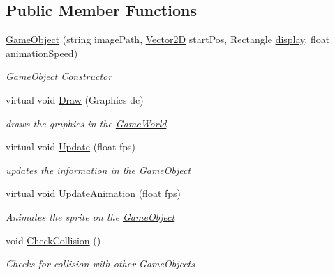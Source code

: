 \subsection*{Public Member Functions}
\begin{DoxyCompactItemize}
\item 
\hyperlink{class_mage_twinstick_1_1_game_object_a70fd6f506e37d368c4b5dc324286e0ec}{Game\+Object} (string image\+Path, \hyperlink{class_mage_twinstick_1_1_vector2_d}{Vector2\+D} start\+Pos, Rectangle \hyperlink{class_mage_twinstick_1_1_game_object_a5807df7f837dc87c8955a008d0b27b50}{display}, float \hyperlink{class_mage_twinstick_1_1_game_object_a5d21c31402c27c5a19f2a62d98720456}{animation\+Speed})
\begin{DoxyCompactList}\small\item\em \hyperlink{class_mage_twinstick_1_1_game_object}{Game\+Object} Constructor \end{DoxyCompactList}\item 
virtual void \hyperlink{class_mage_twinstick_1_1_game_object_a11628f4d9b508e2d976ca25f716b74f5}{Draw} (Graphics dc)
\begin{DoxyCompactList}\small\item\em draws the graphics in the \hyperlink{class_mage_twinstick_1_1_game_world}{Game\+World} \end{DoxyCompactList}\item 
virtual void \hyperlink{class_mage_twinstick_1_1_game_object_a3de8248d06d234f8335525bbb28ccacc}{Update} (float fps)
\begin{DoxyCompactList}\small\item\em updates the information in the \hyperlink{class_mage_twinstick_1_1_game_object}{Game\+Object} \end{DoxyCompactList}\item 
virtual void \hyperlink{class_mage_twinstick_1_1_game_object_a35d6d9af3335b978c618ab73da1215a0}{Update\+Animation} (float fps)
\begin{DoxyCompactList}\small\item\em Animates the sprite on the \hyperlink{class_mage_twinstick_1_1_game_object}{Game\+Object} \end{DoxyCompactList}\item 
void \hyperlink{class_mage_twinstick_1_1_game_object_a5ed64726e236792a162c2899b7446d66}{Check\+Collision} ()
\begin{DoxyCompactList}\small\item\em Checks for collision with other Game\+Objects \end{DoxyCompactList}\item 

\end{DoxyCompactItemize}
